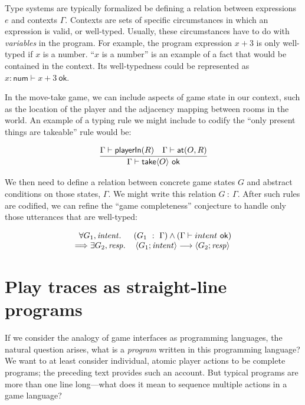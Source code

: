   Type systems are typically formalized be defining a relation between
  expressions $e$ and contexts $\Gamma$. Contexts are sets of specific
  circumstances in which an expression is valid, or well-typed. Usually,
  these circumstances have to do with {\em variables} in the program. For
  example, the program expression $x+3$ is only well-typed if $x$ is
  a number. ``$x$ is a number'' is an example of a fact that would be
  contained in the context. Its well-typedness could be represented as
  $x{:}\mathsf{num} \vdash x+3{\ \mathsf{ok}}$.
  
  In the move-take game, we can include aspects of game state in our
  context, such as the location of the player and the adjacency mapping
  between rooms in the world. An example of a typing rule we might include
  to codify the ``only present things are takeable'' rule would be:

  \[
    \infer
    { 
      \Gamma \vdash \ctake\param{O}\ \syn{ok}
    }
    {
      \Gamma \vdash \syn{playerIn}(R)
      \quad
      \Gamma \vdash \syn{at}(O, R)
    }
  \]

  We then need to define a relation between concrete game states $G$ and
  abstract conditions on those states, $\Gamma$. We might write this
  relation $G\ :\ \Gamma$.
  After such rules are codified, we can refine the ``game completeness''
  conjecture to handle only those utterances that are well-typed:

  \[
  \begin{array}{cc}
  \forall G_1, \mathit{intent}.
  & (G_1\ :\ \Gamma)
    \land
    (\Gamma \vdash intent\ \mathsf{ok})
  \\
\Longrightarrow
  \exists G_2, \mathit{resp}.
  &\left< G_1; \mathit{intent} \right> \longrightarrow \left< G_2; \mathit{resp} \right>
  \end{array}
  \]
  

  \section{Play traces as straight-line programs}
  \label{sec:traces}

  

    If we consider the analogy of game interfaces as programming languages,
    the natural question arises, what is a {\em program} written in this
    programming language? We want to at least consider individual, atomic
    player actions to be complete programs; the preceding text provides
    such an account. But typical programs are more than one line
    long---what does it mean to sequence multiple actions in a game
    language?

